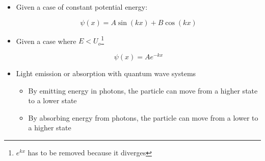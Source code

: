 \begin{itemize}
  \item Given a case of constant potential energy:

    $$\psi(x)=A\sin(kx)+B\cos(kx)$$

  \item Given a case where $E < U_o$\footnote{$e^{kx}$ has to be removed because it diverges}

    $$\psi(x)=Ae^{-kx}$$

  \item Light emission or absorption with quantum wave systems

    \begin{itemize}

      \item By emitting energy in photons, the particle can move from a higher state to a lower state

      \item By absorbing energy from photons, the particle can move from a lower to a higher state

    \end{itemize}

\end{itemize}




